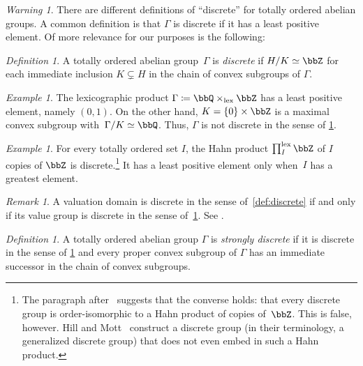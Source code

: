 \documentclass{amsart}
\numberwithin{equation}{section}%
\theoremstyle{remark}
\newtheorem{Def}[equation]{Definition}
\newtheorem{Exa}[equation]{Example}
\newtheorem{Rem}[equation]{Remark}
\newtheorem{War}[equation]{Warning}
\begin{document}
\begin{War}\label{war:discrete}
	There are different definitions of ``discrete'' for totally ordered abelian groups. A common definition is that $\Gamma$ is discrete if it has a least positive element. Of more relevance for our purposes is the following:
\end{War}

\begin{Def}\label{def:discrete-group}
	A totally ordered abelian group~$\Gamma$ is \emph{discrete} if $H/K \simeq \bbZ$ for each immediate inclusion $K \subsetneq H$ in the chain of convex subgroups of $\Gamma$.
\end{Def}

\begin{Exa}
	The lexicographic product $\Gamma \coloneqq \bbQ \times_{\mathrm{lex}} \bbZ$ has a least positive element, namely $(0,1)$. On the other hand, $K= \{0\}\times\bbZ$ is a maximal convex subgroup with~$\Gamma/K \simeq \bbQ$. Thus, $\Gamma$ is not discrete in the sense of \cref{def:discrete-group}.
\end{Exa}

\begin{Exa}\label{exa:hahn-discrete}
	For every totally ordered set $I$, the Hahn product $\prod_I^{\mathrm{lex}} \bbZ$ of $I$ copies of $\bbZ$ is discrete.\footnote{The paragraph after~\cite[Example~2.3]{FuchsSalce01} suggests that the converse holds: that every discrete group is order-isomorphic to a Hahn product of copies of~$\bbZ$. This is false, however. Hill and Mott~\cite[Theorem~3.4]{HillMott73} construct a discrete group (in their terminology, a generalized discrete group) that does not even embed in such a Hahn product.} It has a least positive element only when~$I$ has a greatest element.
\end{Exa}

\begin{Rem}\label{rem:discrete-iff-discrete}
	A valuation domain is discrete in the sense of~\cref{def:discrete} if and only if its value group is discrete in the sense of~\cref{def:discrete-group}. See \cite[Page~205]{Gilmer92}.
\end{Rem}

\begin{Def}\label{def:strongly-discrete-group}
	A totally ordered abelian group $\Gamma$ is \emph{strongly discrete} if it is discrete in the sense of \cref{def:discrete-group} and every proper convex subgroup of $\Gamma$ has an immediate successor in the chain of convex subgroups.
\end{Def}
\end{document}
